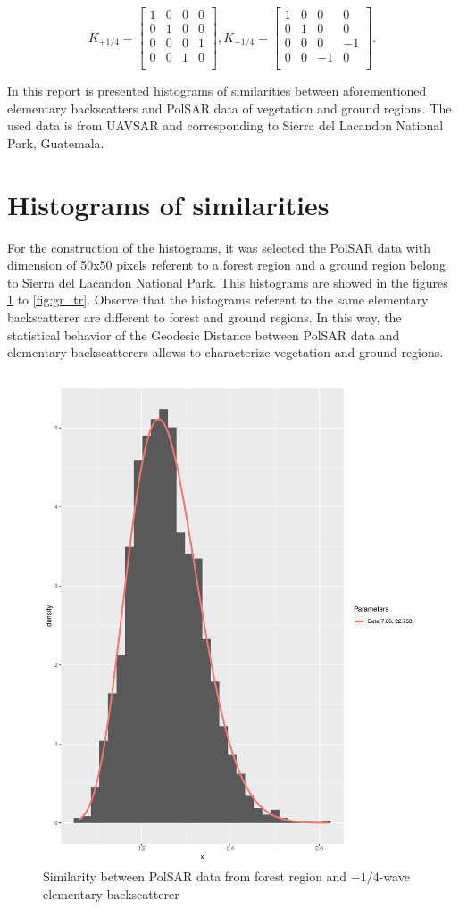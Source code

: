 \documentclass[conference]{IEEEtran}
\begin{document}
\[K_{+1/4}=
\begin{bmatrix}
1 & 0 & 0 & 0\\
0 & 1 & 0 & 0\\
0 & 0 & 0 & 1\\
0 & 0 & 1 & 0\\
\end{bmatrix},
K_{-1/4}=
\begin{bmatrix}
1 & 0 & 0 & 0\\
0 & 1 & 0 & 0\\
0 & 0 & 0 & -1\\
0 & 0 & -1 & 0\\
\end{bmatrix}
.\]

In this report is presented histograms of similarities between aforementioned elementary backscatters and PolSAR data of vegetation and ground regions. 
The used data is from UAVSAR and corresponding to Sierra  del  Lacandon  National  Park,  Guatemala. 

\section{Histograms of similarities}

For the construction of the histograms, it was selected the PolSAR data with dimension of 50x50 pixels referent to a forest region and a ground region belong to Sierra  del  Lacandon  National  Park. This histograms are showed in the figures \ref{fig:fr_wvn} to \ref{fig:gr_tr}. Observe that the histograms referent to the same elementary backscatterer are different to forest and ground regions. In this way, the statistical behavior of the Geodesic Distance between PolSAR data and elementary backscatterers allows to characterize vegetation and ground regions.

\begin{figure}[!ht]
    \vspace{.1\linewidth}
    \centering
    \includegraphics[width = .9\linewidth, height = .7\linewidth]{../../../Figures/paper_19_05/wvn_vegetation.pdf}
    \caption{Similarity between PolSAR data from forest region and $-1/4$-wave elementary backscatterer}
    \label{fig:fr_wvn}
\end{figure}
\end{document}
